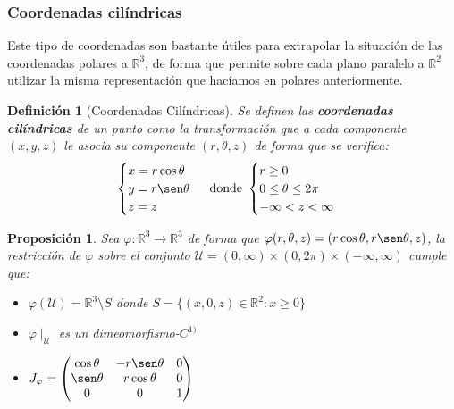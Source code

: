 \documentclass[10pt,a4paper,openright]{book}
\theoremstyle{break}
\newtheorem*{defi}{Definición}
\newtheorem*{prop}{Proposición}
\begin{document}
\subsubsection{Coordenadas cilíndricas}
Este tipo de coordenadas son bastante útiles para extrapolar la situación de las coordenadas polares a $\mathbb{R}^3$, de forma que permite sobre cada plano paralelo a $\mathbb{R}^2$ utilizar la misma representación que hacíamos en polares anteriormente.

\begin{defi}[Coordenadas Cilíndricas]
Se definen las \textbf{coordenadas cilíndricas} de un punto como la transformación que a cada componente $(x,y,z)$ le asocia su componente $(r, \theta, z)$ de forma que se verifica:
$$\begin{cases} x = r \cos \theta \\ y = r \sen \theta \\ z = z\end{cases} \mbox{ donde } \begin{cases} r \ge 0\\ 0 \le \theta \le 2\pi \\ -\infty < z < \infty \end{cases}$$
\end{defi}

\begin{prop}
Sea $\varphi: \mathbb{R}^3\rightarrow  \mathbb{R}^3$ de forma que $\varphi(r, \theta, z) = (r\cos\theta, r\sen\theta, z)$, la restricción de $\varphi$ sobre el conjunto $\mathcal{U} = (0,\infty)\times (0, 2\pi) \times (-\infty, \infty)$ cumple que:
\begin{itemize}
\item $\varphi(\mathcal{U}) = \mathbb{R}^3\setminus{S}$ donde $S = \{(x,0,z)\in \mathbb{R}^2: x\geq 0\}$
\item $\varphi\mid_\mathcal{U}$ es un dimeomorfismo-$C^{1)}$
\item $J_\varphi = \begin{pmatrix}\cos \theta & -r\sen \theta & 0 \\ \sen \theta & r\cos \theta & 0 \\ 0 & 0 & 1\end{pmatrix}$
\end{itemize}
\end{prop}
\end{document}
